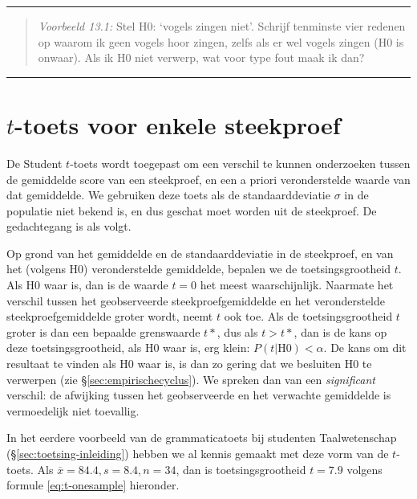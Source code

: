 \documentclass[
]{book}
\begin{document}
\begin{center}\rule{0.5\linewidth}{0.5pt}\end{center}

\begin{quote}
\emph{Voorbeeld 13.1:}
Stel H0: `vogels zingen niet'. Schrijf
tenminste vier redenen op waarom ik geen vogels hoor zingen, zelfs als
er wel vogels zingen (H0 is onwaar). Als ik H0 niet verwerp, wat voor
type fout maak ik dan?
\end{quote}

\begin{center}\rule{0.5\linewidth}{0.5pt}\end{center}

\hypertarget{sec:ttoets-onesample}{%
\section{\texorpdfstring{\(t\)-toets voor enkele steekproef}{t-toets voor enkele steekproef}}\label{sec:ttoets-onesample}}

De Student \(t\)-toets wordt toegepast om een verschil te kunnen onderzoeken tussen
de gemiddelde score van een steekproef, en een a priori veronderstelde
waarde van dat gemiddelde. We gebruiken deze toets als de
standaarddeviatie \(\sigma\) in de populatie niet bekend is, en dus
geschat moet worden uit de steekproef. De gedachtegang is als volgt.

Op grond van het gemiddelde en de standaarddeviatie in de steekproef, en
van het (volgens H0) veronderstelde gemiddelde, bepalen we de toetsingsgrootheid \(t\).
Als H0 waar is, dan is de waarde \(t=0\) het meest waarschijnlijk.
Naarmate het verschil tussen het geobserveerde steekproefgemiddelde en
het veronderstelde steekproefgemiddelde groter wordt, neemt \(t\) ook toe.
Als de toetsingsgrootheid \(t\) groter is dan een bepaalde grenswaarde
\(t*\), dus als \(t>t*\), dan is de kans op deze toetsingsgrootheid, als H0
waar is, erg klein: \(P(t|\textrm{H0}) < \alpha\). De kans om dit
resultaat te vinden als H0 waar is, is dan zo gering dat we besluiten H0
te verwerpen (zie
§\ref{sec:empirischecyclus}). We spreken dan van een \emph{significant}
verschil: de afwijking tussen het geobserveerde en het verwachte
gemiddelde is vermoedelijk niet toevallig.

In het eerdere voorbeeld van de grammaticatoets bij studenten
Taalwetenschap (§\ref{sec:toetsing-inleiding}) hebben we al kennis gemaakt met
deze vorm van de \(t\)-toets.
Als \(\overline{x}=84.4, s=8.4, n=34\), dan is
toetsingsgrootheid \(t=7.9\) volgens formule \eqref{eq:t-onesample} hieronder.
\end{document}
